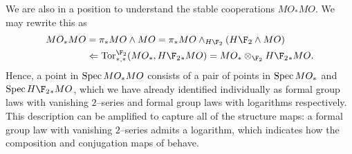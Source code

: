\begin{remark}
We are also in a position to understand the stable cooperations $MO_* MO$.  We may rewrite this as
\begin{align*}
MO_* MO & = \pi_* MO \sm MO = \pi_* MO \sm_{H\F_2} (H\F_2 \sm MO) \\
& \Leftarrow \Tor^{\F_2}_{*, *}(MO_*, H\F_2{}_* MO) = MO_* \otimes_{\F_2} H\F_2{}_* MO.
\end{align*}
Hence, a point in $\operatorname{Spec} MO_* MO$ consists of a pair of points in $\operatorname{Spec} MO_*$ and $\Spec H\F_2{}_* MO$, which we have already identified individually as formal group laws with vanishing $2$--series and formal group laws with logarithms respectively.  This description can be amplified to capture all of the structure maps: a formal group law with vanishing $2$--series admits a logarithm, which indicates how the composition and conjugation maps of  behave.
\end{remark}


